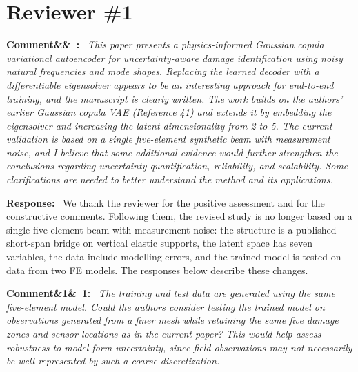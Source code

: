 \documentclass[11pt]{article}
\newenvironment{rcomment}[1]{\par\bigskip\noindent\textbf{Comment\ifx&#1&\else\ #1\fi:}\ \itshape}{\par}
\newenvironment{response}{\par\smallskip\noindent\color{resp}\textbf{Response:}\ }{\par}
\begin{document}
\section{Reviewer \#1}

\begin{rcomment}{}
This paper presents a physics-informed Gaussian copula variational autoencoder for uncertainty-aware damage
identification using noisy natural frequencies and mode shapes. Replacing the learned decoder with a differentiable
eigensolver appears to be an interesting approach for end-to-end training, and the manuscript is clearly written. The work
builds on the authors' earlier Gaussian copula VAE (Reference 41) and extends it by embedding the eigensolver and
increasing the latent dimensionality from 2 to 5. The current validation is based on a single five-element synthetic
beam with measurement noise, and I believe that some additional evidence would further strengthen the conclusions
regarding uncertainty quantification, reliability, and scalability. Some clarifications are needed to better understand
the method and its applications.
\end{rcomment}

\begin{response}
We thank the reviewer for the positive assessment and for the constructive comments. Following them, the revised
study is no longer based on a single five-element beam with measurement noise: the structure is a published short-span bridge on
vertical elastic supports, the latent space has seven variables, the data include modelling
errors, and the trained model is tested on data from two FE models. The responses below describe these changes.
\end{response}

\begin{rcomment}{1}
The training and test data are generated using the same five-element model. Could the authors consider testing the
trained model on observations generated from a finer mesh while retaining the same five damage zones and sensor
locations as in the current paper? This would help assess robustness to model-form uncertainty, since field observations
may not necessarily be well represented by such a coarse discretization.
\end{rcomment}
\end{document}
